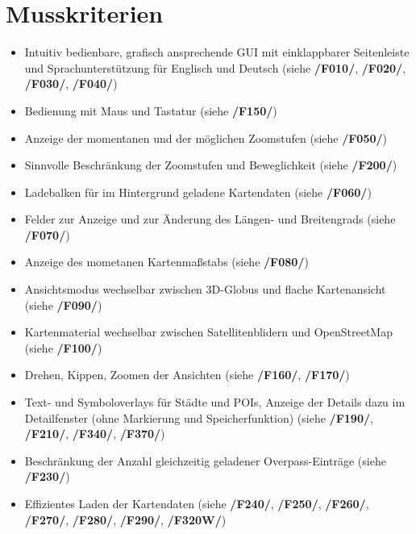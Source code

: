 \documentclass[10pt]{scrreprt}
\begin{document}
\section{Musskriterien}
\begin{itemize}
\item Intuitiv bedienbare, grafisch ansprechende GUI mit einklappbarer Seitenleiste und Sprachunterstützung für Englisch und Deutsch (siehe \textbf{/F010/}, \textbf{/F020/}, \textbf{/F030/}, \textbf{/F040/})
\item Bedienung mit Maus und Tastatur (siehe \textbf{/F150/})
\item Anzeige der momentanen und der möglichen Zoomstufen (siehe \textbf{/F050/})
\item Sinnvolle Beschränkung der Zoomstufen und Beweglichkeit (siehe \textbf{/F200/})
\item Ladebalken für im Hintergrund geladene Kartendaten (siehe \textbf{/F060/})
\item Felder zur Anzeige und zur Änderung des Längen- und Breitengrads (siehe \textbf{/F070/})
\item Anzeige des mometanen Kartenmaßstabs (siehe \textbf{/F080/})
\item Ansichtsmodus wechselbar zwischen 3D-Globus und flache Kartenansicht (siehe \textbf{/F090/})
\item Kartenmaterial wechselbar zwischen Satellitenblidern und OpenStreetMap (siehe \textbf{/F100/})
\item Drehen, Kippen, Zoomen der Ansichten (siehe \textbf{/F160/}, \textbf{/F170/})
\item Text- und Symboloverlays für Städte und POIs, Anzeige der Details dazu im Detailfenster (ohne Markierung und Speicherfunktion) (siehe \textbf{/F190/}, \textbf{/F210/}, \textbf{/F340/}, \textbf{/F370/})
\item Beschränkung der Anzahl gleichzeitig geladener Overpass-Einträge (siehe \textbf{/F230/})
\item Effizientes Laden der Kartendaten (siehe \textbf{/F240/}, \textbf{/F250/}, \textbf{/F260/}, \textbf{/F270/}, \textbf{/F280/}, \textbf{/F290/}, \textbf{/F320W/})
\end{itemize}
\end{document}
